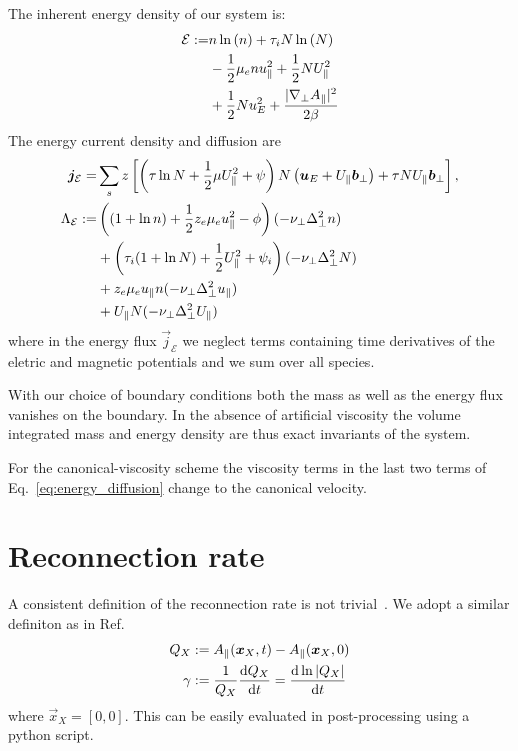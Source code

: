 The inherent energy density of our system is:
\begin{align}
 \mathcal{E} := &
                    n  \ln{(\ensuremath{n })}
                  + \tau_i N \ln{( \ensuremath{N})}
                  \nonumber \\
                 &- \frac{1}{2} \mu_e n  u_\parallel^2
                  + \frac{1}{2} N U_\parallel^2
                  \nonumber \\
                 &+\frac{1}{2} N u_E^2
                  + \frac{|\nabla_\perp A_\parallel|^2}{2 \beta}
\end{align}
The energy current density and diffusion are
\begin{align}
  {\boldsymbol{j}}_{\mathcal E} =& \sum_s z\left[
  \left(\tau \ln N + \frac{1}{2}\mu U_\parallel^2 + \psi \right)N\left(
  {\boldsymbol{u}}_E +U_\parallel {\boldsymbol{b}}_\perp  \right) + \tau NU_\parallel  {\boldsymbol{b}}_\perp\right]
  , \\
    \Lambda_\mathcal{E} :=  &\left( (1+\ln n ) + \frac{1}{2} z_e \mu_e u_\parallel^2 - \phi \right) (-\nu_\perp \Delta_\perp^2 n )
    \nonumber\\
    &+ \left( \tau_i ( 1+\ln N) + \frac{1}{2} U_\parallel^2 + \psi_i\right)(-\nu_\perp \Delta_\perp^2 N)
    \nonumber\\
    &+ z_e\mu_e u_\parallel n  (-\nu_\perp \Delta_\perp^2 u_\parallel)
    \nonumber\\
    &+ U_\parallel N (-\nu_\perp \Delta_\perp^2 U_\parallel)
    \label{eq:energy_diffusion}
\end{align}
where in the energy flux $\vec j_{\mathcal E}$
we neglect terms  containing time derivatives
of the eletric and magnetic potentials and we sum over all species.

With our choice of boundary conditions both the mass as well as the energy flux
vanishes on the boundary. In the absence of artificial viscosity the volume integrated
mass and energy density are thus exact invariants of the system.
\begin{tcolorbox}[title=Note]
    For the canonical-viscosity scheme the viscosity terms in the last two
    terms of Eq.~\eqref{eq:energy_diffusion} change to the canonical velocity.
\end{tcolorbox}


\section{Reconnection rate}
 A consistent definition of the reconnection rate is not trivial~\cite{Comisso2016}.
 We adopt a similar definiton as in Ref.~\cite{Comisso2013}
\begin{align}
    Q_X&:= A_\parallel({\boldsymbol{x}}_X,t) - A_\parallel( {\boldsymbol{x}}_X,0) \\
 \gamma&:= \frac{1}{Q_X}\frac{\mathrm{d} Q_X}{\mathrm{d} t} = \frac{\mathrm{d} \ln{|Q_X|}}{\mathrm{d} t}
\end{align}
where $\vec{x}_X = [0,0]$.
This can be easily evaluated in post-processing using a python script.

